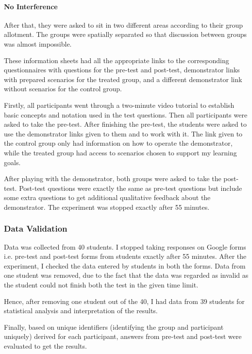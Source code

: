 \paragraph{No Interference} After that, they were asked to sit in two different areas according to their group allotment. The groups were spatially separated so that discussion between groups was almost impossible.

These information sheets had all the appropriate links to the corresponding questionnaires with questions for the pre-test and post-test, demonstrator links with prepared scenarios for the treated group, and a different demonstrator link without scenarios for the control group.

Firstly, all participants went through a two-minute video tutorial to establish basic concepts and notation used in the test questions. Then all participants were asked to take the pre-test. After finishing the pre-test, the students were asked to use the demonstrator links given to them and to work with it. The link given to the control group only had information on how to operate the demonstrator, while the treated group had access to scenarios chosen to support my learning goals. 

After playing with the demonstrator, both groups were asked to take the post-test. Post-test questions were exactly the same as pre-test questions but include some extra questions to get additional qualitative feedback about the demonstrator. The experiment was stopped exactly after 55 minutes.

\subsubsection{Data Validation}\label{subsubsec:datavalidation}
Data was collected from 40 students. I stopped taking responses on Google forms i.e. pre-test and post-test forms from students exactly after 55 minutes. After the experiment, I checked the data entered by students in both the forms. Data from one student was removed, due to the fact that the data was regarded as invalid as the student could not finish both the test in the given time limit.

Hence, after removing one student out of the 40, I had data from 39 students for statistical analysis and interpretation of the results.

Finally, based on unique identifiers (identifying the group and participant uniquely) derived for each participant, answers from pre-test and post-test were evaluated to get the results. 

